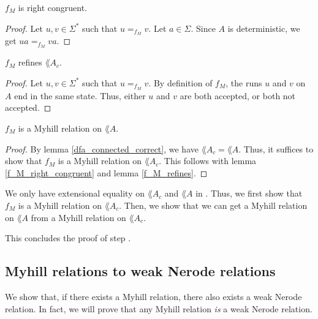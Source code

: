 \begin{lemma}
    \label{f_M_right_congruent}
    $f_M$ is right congruent.
\end{lemma}
\begin{proof}
    Let $u,v \in \Sigma^*$ such that $u =_{f_M} v$.
    Let $a \in \Sigma$. Since $A$ is deterministic, we get $ua =_{f_M} va$.
\end{proof}

\begin{lemma}
    \label{f_M_refines}
    $f_M$ refines $\lang{A_c}$.
\end{lemma}
\begin{proof}
    Let $u,v \in \Sigma^*$ such that $u =_{f_M} v$.
    By definition of $f_M$, the runs $u$ and $v$ on $A$ end in the same state.
    Thus, either $u$ and $v$ are both accepted, or both not accepted.
\end{proof}

\begin{theorem}
    \label{dfa_to_myhill}
    $f_M$ is a Myhill relation on $\lang{A}$.
\end{theorem}
\begin{proof}
    By lemma \ref{dfa_connected_correct}, we have $\lang{A_c} = \lang{A}$.
    Thus, it suffices to show that $f_M$ is a Myhill relation on $\lang{A_c}$.
    This follows with lemma \ref{f_M_right_congruent} and lemma \ref{f_M_refines}.
\end{proof}


We only have extensional equality on $\lang{A_c}$ and $\lang{A}$ in \coq.
Thus, we first show that $f_M$ is a Myhill relation on $\lang{A_c}$.
Then, we show that we can get a Myhill relation on $\lang{A}$ from a Myhill relation on $\lang{A_c}$.



This concludes the proof of step .

\subsection{Myhill relations to weak Nerode relations}
We show that, if there exists a Myhill relation, there also exists a weak Nerode relation.
In fact, we will prove that any Myhill relation \textit{is} a weak Nerode relation.

